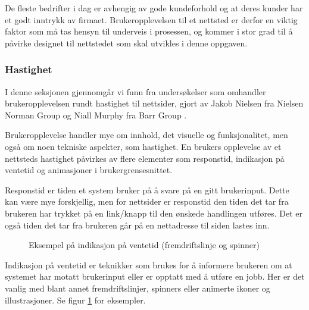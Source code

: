 De fleste bedrifter i dag er avhengig av gode kundeforhold og at deres kunder har et godt inntrykk av firmaet. Brukeropplevelsen til et nettsted er derfor en viktig faktor som må tas hensyn til underveis i prosessen, og kommer i stor grad til å påvirke designet til nettstedet som skal utvikles i denne oppgaven.

\subsubsection{Hastighet}
I denne seksjonen gjennomgår vi funn fra undersøkelser som omhandler brukeropplevelsen rundt hastighet til nettsider, gjort av Jakob Nielsen fra Nielsen Norman Group \cite{nngroupWebsiteResponseTimes} og Niall Murphy fra Barr Group \cite{barrgroupReponseTimingUI}. 

Brukeropplevelse handler mye om innhold, det visuelle og funksjonalitet, men også om noen tekniske aspekter, som hastighet. En brukers opplevelse av et nettsteds hastighet påvirkes av flere elementer som responstid, indikasjon på ventetid og animasjoner i brukergrensesnittet.

Responstid er tiden et system bruker på å svare på en gitt brukerinput.
Dette kan være mye forskjellig, men for nettsider er responstid den tiden det tar fra brukeren har trykket på en link/knapp til den ønskede handlingen utføres. Det er også tiden det tar fra brukeren går på en nettadresse til siden lastes inn.

\begin{figure}[H]
    \centering
    \caption{Eksempel på indikasjon på ventetid (fremdriftslinje og spinner)}
    \label{fig:analysis-loading-indicators}
\end{figure}

Indikasjon på ventetid er teknikker som brukes for å informere brukeren om at systemet har motatt brukerinput eller er opptatt med å utføre en jobb. Her er det vanlig med blant annet fremdriftslinjer, spinners eller animerte ikoner og illustrasjoner. Se figur \ref{fig:analysis-loading-indicators} for eksempler.

